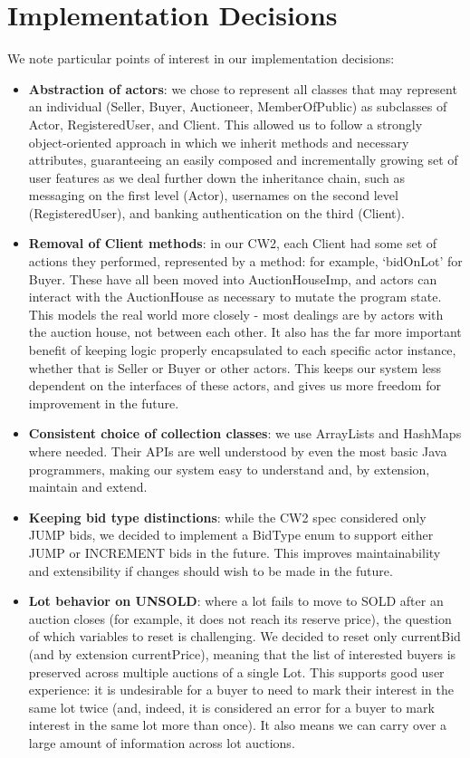 \documentclass[titlepage, 12pt]{extarticle}
\begin{document}
\section{Implementation Decisions}
We note particular points of interest in our implementation decisions:
\begin{itemize}
    \item {\bf Abstraction of actors}: we chose to represent all classes that may represent an individual (Seller, Buyer, Auctioneer, MemberOfPublic) as subclasses of Actor, RegisteredUser, and Client. This allowed us to follow a strongly object-oriented approach in which we inherit methods and necessary attributes, guaranteeing an easily composed and incrementally growing set of user features as we deal further down the inheritance chain, such as messaging on the first level (Actor), usernames on the second level (RegisteredUser), and banking authentication on the third (Client).
    \item {\bf Removal of Client methods}: in our CW2, each Client had some set
        of actions they performed, represented by a method: for example,
        `bidOnLot' for Buyer. These have all been moved into AuctionHouseImp, and actors can interact with the AuctionHouse as necessary to mutate the program state. This models the real world more closely - most dealings are by actors with the auction house, not between each other. It also has the far more important benefit of keeping logic properly encapsulated to each specific actor instance, whether that is Seller or Buyer or other actors. This keeps our system less dependent on the interfaces of these actors, and gives us more freedom for improvement in the future.
    \item {\bf Consistent choice of collection classes}: we use ArrayLists and
      HashMaps where needed. Their APIs are well understood by even the most basic Java programmers, making our system easy to understand and, by extension, maintain and extend.
    \item {\bf Keeping bid type distinctions}: while the CW2 spec considered only JUMP bids, we decided to implement a BidType enum to support either JUMP or INCREMENT bids in the future. This improves maintainability and extensibility if changes should wish to be made in the future. 
    \item {\bf Lot behavior on UNSOLD}: where a lot fails to move to SOLD after an auction closes (for example, it does not reach its reserve price), the question of which variables to reset is challenging. We decided to reset only currentBid (and by extension currentPrice), meaning that the list of interested buyers is preserved across multiple auctions of a single Lot. This supports good user experience: it is undesirable for a buyer to need to mark their interest in the same lot twice (and, indeed, it is considered an error for a buyer to mark interest in the same lot more than once). It also means we can carry over a large amount of information across lot auctions.
\end{itemize}


\end{document}
